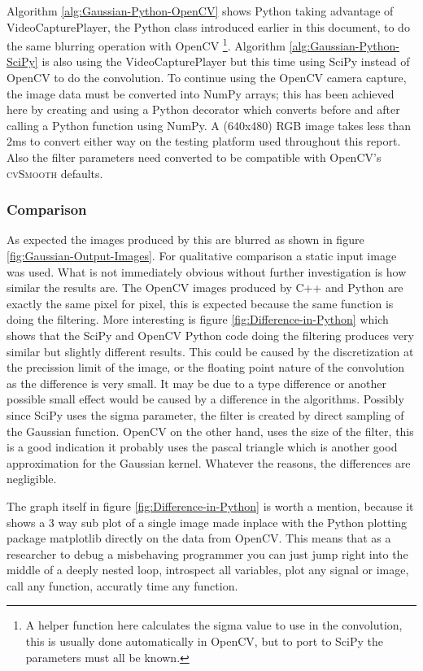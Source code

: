 \documentclass[english]{IEEEtran}
\newcommand{\noun}[1]{\textsc{#1}}
\theoremstyle{plain}
\begin{document}
Algorithm \ref{alg:Gaussian-Python-OpenCV} shows Python taking advantage
of VideoCapturePlayer, the Python class introduced earlier in this
document, to do the same blurring operation with OpenCV%
\footnote{A helper function here calculates the sigma value to use in the convolution,
this is usually done automatically in OpenCV, but to port to SciPy
the parameters must all be known.%
}. Algorithm \ref{alg:Gaussian-Python-SciPy} is also using the VideoCapturePlayer
but this time using SciPy instead of OpenCV to do the convolution.
To continue using the OpenCV camera capture, the image data must be
converted into NumPy arrays; this has been achieved here by creating
and using a Python decorator which converts before and after calling
a Python function using NumPy. A (640x480) RGB image takes less than
2ms to convert either way on the testing platform used throughout
this report. Also the filter parameters need converted to be compatible
with OpenCV's \noun{cvSmooth} defaults\cite{bradski2008learning}.


\subsubsection{Comparison}

As expected the images produced by this are blurred as shown in figure
\ref{fig:Gaussian-Output-Images}. For qualitative comparison a static
input image was used. What is not immediately obvious without further
investigation is how similar the results are. The OpenCV images produced
by C++ and Python are exactly the same pixel for pixel, this is expected
because the same function is doing the filtering. More interesting
is figure \ref{fig:Difference-in-Python} which shows that the SciPy
and OpenCV Python code doing the filtering produces very similar but
slightly different results. This could be caused by the discretization
at the precission limit of the image, or the floating point nature
of the convolution as the difference is very small. It may be due
to a type difference or another possible small effect would be caused
by a difference in the algorithms. Possibly since SciPy uses the sigma
parameter, the filter is created by direct sampling of the Gaussian
function. OpenCV on the other hand, uses the size of the filter, this
is a good indication it probably uses the pascal triangle which is
another good approximation for the Gaussian kernel\cite{ben1991image}.
Whatever the reasons, the differences are negligible.

The graph itself in figure \ref{fig:Difference-in-Python} is worth
a mention, because it shows a 3 way sub plot of a single image made
inplace with the Python plotting package matplotlib directly on the
data from OpenCV. This means that as a researcher to debug a misbehaving
programmer you can just jump right into the middle of a deeply nested
loop, introspect all variables, plot any signal or image, call any
function, accuratly time any function.
\end{document}
